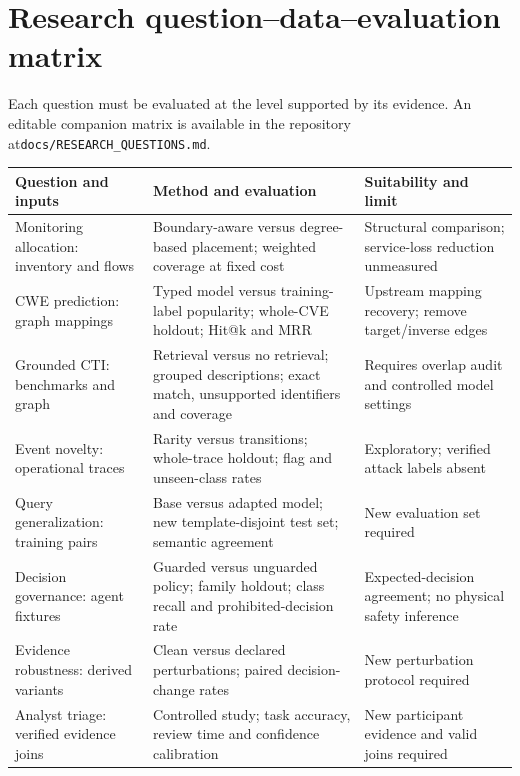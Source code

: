 \clearpage\section{Research question--data--evaluation matrix}
Each question must be evaluated at the level supported by its evidence. An editable companion matrix is available in the repository at\newline \texttt{docs/RESEARCH\_QUESTIONS.md}.

\begingroup\footnotesize\renewcommand{\arraystretch}{1.32}
\begin{tabularx}{\linewidth}{>{\raggedright\arraybackslash}p{31mm}>{\raggedright\arraybackslash}X>{\raggedright\arraybackslash}X}
\toprule\textbf{Question and inputs} & \textbf{Method and evaluation} & \textbf{Suitability and limit}\\\midrule
Monitoring allocation: inventory and flows & Boundary-aware versus degree-based placement; weighted coverage at fixed cost & Structural comparison; service-loss reduction unmeasured\\
CWE prediction: graph mappings & Typed model versus training-label popularity; whole-CVE holdout; Hit@k and MRR & Upstream mapping recovery; remove target/inverse edges\\
Grounded CTI: benchmarks and graph & Retrieval versus no retrieval; grouped descriptions; exact match, unsupported identifiers and coverage & Requires overlap audit and controlled model settings\\
Event novelty: operational traces & Rarity versus transitions; whole-trace holdout; flag and unseen-class rates & Exploratory; verified attack labels absent\\
Query generalization: training pairs & Base versus adapted model; new template-disjoint test set; semantic agreement & New evaluation set required\\
Decision governance: agent fixtures & Guarded versus unguarded policy; family holdout; class recall and prohibited-decision rate & Expected-decision agreement; no physical safety inference\\
Evidence robustness: derived variants & Clean versus declared perturbations; paired decision-change rates & New perturbation protocol required\\
Analyst triage: verified evidence joins & Controlled study; task accuracy, review time and confidence calibration & New participant evidence and valid joins required\\
\bottomrule\end{tabularx}\endgroup

